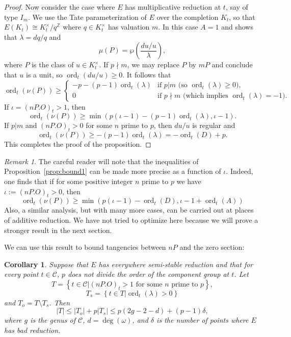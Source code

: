 \documentclass[12pt,reqno]{amsart}
\numberwithin{equation}{section}
\theoremstyle{plain}
\newtheorem{cor}[subsection]{Corollary}
\theoremstyle{definition}
\theoremstyle{remark}
\newtheorem{rem}[subsection]{Remark}
\newcommand{\CC}{\mathcal{C}}
\newcommand{\Z}{\mathbb{Z}}
\newcommand{\<}{\langle}
\renewcommand{\>}{\rangle}
\DeclareMathOperator{\ord}{ord}
\numberwithin{equation}{section}
\begin{document}
\begin{proof}
 Now consider the case where $E$ has multiplicative reduction at $t$,
 say of type $I_m$.  We use the Tate parameterization of $E$ over the
 completion $K_t$, so that $E(K_t)\cong K_t^\times/q^\Z$ where $q\in
 K_t^\times$ has valuation $m$.  In this case $A=1$ and
 \cite[\S6]{Voloch90} shows that $\lambda=dq/q$ and
 \[\mu(P)=\wp\left(\frac{du/u}{\lambda}\right),\]
 where $P$ is the class of $u\in K_t^\times$.  If $p\nmid m$, we may
 replace $P$ by $mP$ and conclude that $u$ is a unit, so
 $\ord_t(du/u)\ge0$. It follows that
 \[\ord_t(\nu(P))\ge
   \begin{cases}
     -p-(p-1)\ord_t(\lambda)&\text{if $p|m$ (so $\ord_t(\lambda)\ge0$),}\\
     0&\text{if $p\nmid m$ (which implies $\ord_t(\lambda)=-1$).}
   \end{cases}\]
If $\iota=(nP.O)_t>1$, then 
\[\ord_t(\nu(P))\ge\min\left(p(\iota-1)-(p-1)\ord_t(\lambda),
    \iota-1\right).\]
If $p|m$ and $(nP.O)_t>0$ for some $n$ prime to $p$, then $du/u$ is
regular and
\[\ord_t(\nu(P))\ge -(p-1)\ord_t(\lambda)=-\ord_t(D)+p.\]
This completes the proof of the proposition.
\end{proof}

\begin{rem}\label{rem:bounds}
  The careful reader will note that the inequalities of
  Proposition~\ref{prop:bound1} can be made more precise as a function
  of $\iota$.  Indeed, one finds that if for some positive integer $n$
  prime to $p$ we have $\iota:=(nP.O)_t>0$, then
  \[\ord_t(\nu(P))\ge
    \min\left(p(\iota-1)-\ord_t(D),\iota-1+\ord_t(A)\right)\]
  Also, a similar analysis, but with many more
  cases, can be carried out at places of additive reduction.  We
  have not tried to optimize here because we will prove a stronger
  result in the next section.
  \end{rem}

We can use this result to bound tangencies between $nP$ and the zero
section: 
\begin{cor}\label{cor:bound1}
  Suppose that $E$ has everywhere semi-stable reduction and that for
  every point $t\in\CC$, $p$ does not divide the order of the
  component group at $t$.  Let
  \[T=\left\{t\in\CC\left.\mid (nP.O)_t>1\text{ for some $n$ prime to
          $p$}\right.\right\},\]
    \[T_s=\left\{t\in T\left.\mid \ord_t(\lambda)>0\right.\right\}\]
    and $T_o=T\setminus T_s$.  Then
    \[|T|\le |T_o|+p|T_s|\le p(2g-2-d)+(p-1)\delta,\] %
    where $g$ is the genus of $\CC$, $d=\deg(\omega)$, and $\delta$ is
    the number of points where $E$ has bad reduction.
  \end{cor}
\end{document}
